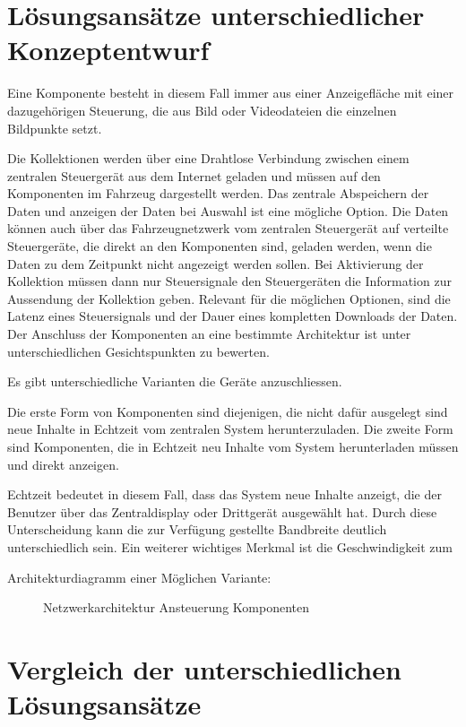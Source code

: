 \section{Lösungsansätze unterschiedlicher Konzeptentwurf}
Eine Komponente besteht in diesem Fall immer aus einer Anzeigefläche mit einer dazugehörigen Steuerung, die aus Bild oder Videodateien die einzelnen Bildpunkte setzt.

Die Kollektionen werden über eine Drahtlose Verbindung zwischen einem zentralen Steuergerät aus dem Internet geladen und müssen auf den Komponenten im Fahrzeug dargestellt werden. 
Das zentrale Abspeichern der Daten und anzeigen der Daten bei Auswahl ist eine mögliche Option.
Die Daten können auch über das Fahrzeugnetzwerk vom zentralen Steuergerät auf verteilte Steuergeräte, die direkt an den Komponenten sind, geladen werden, wenn die Daten zu dem Zeitpunkt nicht angezeigt werden sollen. Bei Aktivierung der Kollektion müssen dann nur Steuersignale den Steuergeräten die Information zur Aussendung der Kollektion geben.
Relevant für die möglichen Optionen, sind die Latenz eines Steuersignals und der Dauer eines kompletten Downloads der Daten.
Der Anschluss der Komponenten an eine bestimmte Architektur ist unter unterschiedlichen Gesichtspunkten zu bewerten.

Es gibt unterschiedliche Varianten die Geräte anzuschliessen.

Die erste Form von Komponenten sind diejenigen, die nicht dafür ausgelegt sind neue Inhalte in Echtzeit vom zentralen System herunterzuladen.
Die zweite Form sind Komponenten, die in Echtzeit neu Inhalte vom System herunterladen müssen und direkt anzeigen.

Echtzeit bedeutet in diesem Fall, dass das System neue Inhalte anzeigt, die der Benutzer über das Zentraldisplay oder Drittgerät ausgewählt hat.
Durch diese Unterscheidung kann die zur Verfügung gestellte Bandbreite deutlich unterschiedlich sein. 
Ein weiterer wichtiges Merkmal ist die Geschwindigkeit zum 


Architekturdiagramm einer Möglichen Variante:
\begin{figure}[hbt]
	\centering
	
	\caption[Netzwerkarchitektur Ansteuerung Komponenten]{Netzwerkarchitektur Ansteuerung Komponenten}
	\label{fig:architektur1}
\end{figure}
\section{Vergleich der unterschiedlichen Lösungsansätze}





